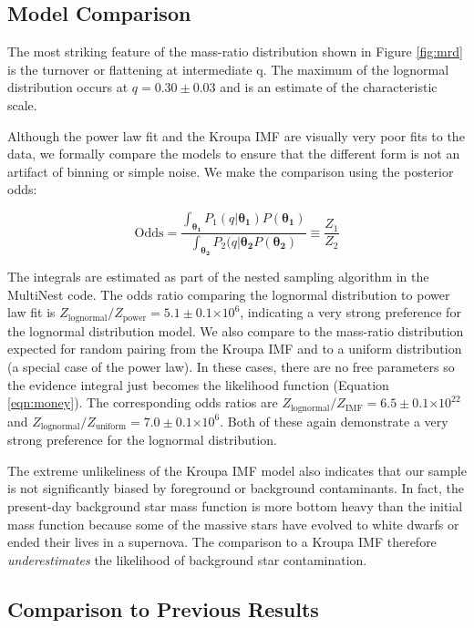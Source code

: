 \documentclass{emulateapj}
\providecommand{\e}[1]{\ensuremath{\times 10^{#1}}}
\renewcommand{\vec}[1]{\bm{#1}}
\begin{document}
\subsection{Model Comparison}

The most striking feature of the mass-ratio distribution shown in Figure \ref{fig:mrd} is the turnover or flattening at intermediate q. The maximum of the lognormal distribution occurs at $q = 0.30 \pm 0.03$ and is an estimate of the characteristic scale.

Although the power law fit and the Kroupa IMF are visually very poor fits to the data, we formally compare the models to ensure that the different form is not an artifact of binning or simple noise. We make the comparison using the posterior odds:

\begin{equation}
\mathrm{Odds} = \frac{\int_{\vec{\theta_1}} P_1(q|\vec{\theta_1}) P(\vec{\theta_1})}{\int_{\vec{\theta_2}} P_2(q|\vec{\theta_2}  P(\vec{\theta_2})} \equiv \frac{Z_1}{Z_2}
\end{equation}

The integrals are estimated as part of the nested sampling algorithm in the MultiNest code. The odds ratio comparing the lognormal distribution to power law fit is $Z_\mathrm{lognormal} / Z_\mathrm{power} = 5.1 \pm 0.1 \e{6}$, indicating a very strong preference for the lognormal distribution model. We also compare to the mass-ratio distribution expected for random pairing from the Kroupa IMF and to a uniform distribution (a special case of the power law). In these cases, there are no free parameters so the evidence integral just becomes the likelihood function (Equation \ref{eqn:money}). The corresponding odds ratios are  $Z_\mathrm{lognormal} / Z_\mathrm{IMF} = 6.5 \pm 0.1 \e{22}$ and $Z_\mathrm{lognormal} / Z_\mathrm{uniform} = 7.0 \pm 0.1 \e{6}$. Both of these again demonstrate a very strong preference for the lognormal distribution. 

The extreme unlikeliness of the Kroupa IMF model also indicates that our sample is not significantly biased by foreground or background contaminants. In fact, the present-day background star mass function is more bottom heavy than the initial mass function because some of the massive stars have evolved to white dwarfs or ended their lives in a supernova. The comparison to a Kroupa IMF therefore \emph{underestimates} the likelihood of background star contamination.


\subsection{Comparison to Previous Results}
\end{document}
